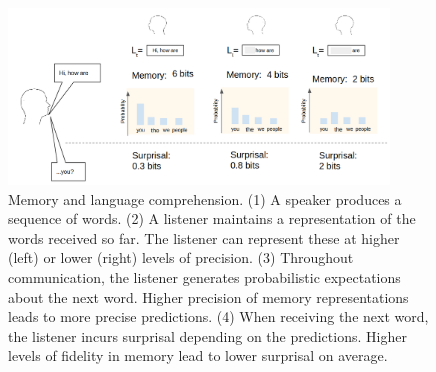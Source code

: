
%
%

\begin{figure}
\centering
\includegraphics[width=0.9\textwidth]{figures-gdrive/communication.png}
	\caption{Memory and language comprehension. (1) A speaker produces a sequence of words. (2) A listener maintains a representation of the words received so far. The listener can represent these at higher (left) or lower (right) levels of precision. (3) Throughout communication, the listener generates probabilistic expectations about the next word. Higher precision of memory representations leads to more precise predictions. (4) When receiving the next word, the listener incurs surprisal depending on the predictions. Higher levels of fidelity in memory lead to lower surprisal on average.  }
	\label{fig:communication}
\end{figure}

